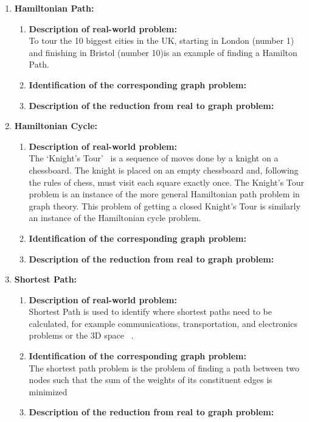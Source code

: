 \documentclass[article, 10pt,onecolumn]{article}
\begin{document}
\begin{enumerate}
\item \textbf{Hamiltonian Path:} 
 \begin{enumerate}
   \item \textbf{Description of real-world problem:}\\
    To tour the 10 biggest cities in the UK, starting in London (number 1) and finishing in Bristol (number 10)is an example of finding a
    Hamilton Path.~\cite{path}
   \item \textbf{Identification of the corresponding graph problem:} 
   \item \textbf{Description of the reduction from real to graph problem:} 
  \end{enumerate}
  
\item \textbf{Hamiltonian Cycle:} 
 \begin{enumerate}
   \item \textbf{Description of real-world problem:}\\
    The `Knight's Tour'~\cite{knight} is a sequence of moves done by a knight on a chessboard. The knight is placed on an empty chessboard
    and, following the rules of chess, must visit each square exactly once. The Knight's Tour problem is an instance of the more general
    Hamiltonian path problem in graph theory. This problem of getting a closed Knight's Tour is similarly an instance of the Hamiltonian
    cycle problem.
   \item \textbf{Identification of the corresponding graph problem:} 
   \item \textbf{Description of the reduction from real to graph problem:} 
 \end{enumerate}

\item \textbf{Shortest Path:} 
 \begin{enumerate}
   \item \textbf{Description of real-world problem:}\\
    Shortest Path is used to identify where shortest paths need to be calculated, for example communications, transportation, and electronics
    problems or the 3D space ~\cite{Mobile}.
   \item \textbf{Identification of the corresponding graph problem:}\\
    The shortest path problem is the problem of finding a path between two nodes such that the sum of the weights of its constituent edges
    is minimized
   \item \textbf{Description of the reduction from real to graph problem:}\\   
  \end{enumerate}
 

\end{enumerate}
\end{document}
